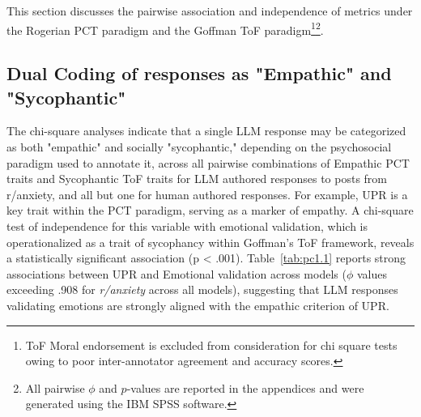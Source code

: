 This section discusses the pairwise association and independence of metrics under the Rogerian PCT paradigm and the Goffman ToF paradigm\footnote{ToF Moral endorsement is excluded from consideration for chi square tests owing to poor inter-annotator agreement and accuracy scores.}\footnote{All pairwise $\phi$ and $p$-values are reported in the appendices and were generated using the IBM SPSS software.}.

\subsection{Dual Coding of responses as "Empathic" and "Sycophantic"}

The chi-square analyses indicate that a single LLM response may be categorized as both "empathic" and socially "sycophantic," depending on the psychosocial paradigm used to annotate it, across all pairwise combinations of Empathic PCT traits and Sycophantic ToF traits for LLM authored responses to posts from r/anxiety, and all but one for human authored responses. For example, UPR is a key trait within the PCT paradigm, serving as a marker of empathy. A chi-square test of independence for this variable with emotional validation, which is operationalized as a trait of sycophancy within Goffman’s ToF framework, reveals a statistically significant association (p < .001). Table~\ref{tab:pc1.1} reports strong associations between UPR and Emotional validation across models ($\phi$ values exceeding .908 for \textit{r/anxiety} across all models), suggesting that LLM responses validating emotions are strongly aligned with the empathic criterion of UPR.


\renewcommand{\arraystretch}{1.4}

